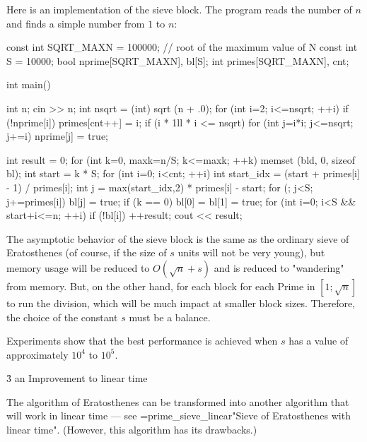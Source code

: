 Here is an implementation of the sieve block. The program reads the number of $n$ and finds a simple number from $1$ to $n$:

\code
const int SQRT_MAXN = 100000; // root of the maximum value of N
const int S = 10000;
bool nprime[SQRT_MAXN], bl[S];
int primes[SQRT_MAXN], cnt;

int main() {

int n;
cin >> n;
int nsqrt = (int) sqrt (n + .0);
for (int i=2; i<=nsqrt; ++i)
if (!nprime[i]) {
primes[cnt++] = i;
if (i * 1ll * i <= nsqrt)
for (int j=i*i; j<=nsqrt; j+=i)
nprime[j] = true;
}

int result = 0;
for (int k=0, maxk=n/S; k<=maxk; ++k) {
memset (bld, 0, sizeof bl);
int start = k * S;
for (int i=0; i<cnt; ++i) {
int start_idx = (start + primes[i] - 1) / primes[i];
int j = max(start_idx,2) * primes[i] - start;
for (; j<S; j+=primes[i])
bl[j] = true;
}
if (k == 0)
bl[0] = bl[1] = true;
for (int i=0; i<S && start+i<=n; ++i)
if (!bl[i])
++result;
}
cout << result;

}
\endcode

The asymptotic behavior of the sieve block is the same as the ordinary sieve of Eratosthenes (of course, if the size of $s$ units will not be very young), but memory usage will be reduced to $O(\sqrt{n} + s)$ and is reduced to "wandering" from memory. But, on the other hand, for each block for each Prime in $[1; \sqrt{n}]$ to run the division, which will be much impact at smaller block sizes. Therefore, the choice of the constant $s$ must be a balance.

Experiments show that the best performance is achieved when $s$ has a value of approximately $10^4$ to $10^5$.


\h3{ an Improvement to linear time }

The algorithm of Eratosthenes can be transformed into another algorithm that will work in linear time --- see \algohref=prime_sieve_linear{"Sieve of Eratosthenes with linear time"}. (However, this algorithm has its drawbacks.)
